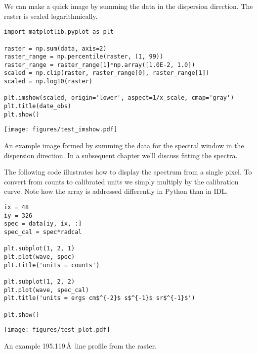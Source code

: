 We can make a quick image by summing the data in the dispersion direction. The
raster is scaled logarithmically.
\begin{lstlisting}
import matplotlib.pyplot as plt

raster = np.sum(data, axis=2)
raster_range = np.percentile(raster, (1, 99))
raster_range = raster_range[1]*np.array([1.0E-2, 1.0])
scaled = np.clip(raster, raster_range[0], raster_range[1])
scaled = np.log10(raster)

plt.imshow(scaled, origin='lower', aspect=1/x_scale, cmap='gray')
plt.title(date_obs)
plt.show()
\end{lstlisting}
\begin{marginfigure}
  \centerline{\texttt{[image: figures/test\_imshow.pdf]}}
  \caption{An example image formed by summing the data for the  spectral window in the
    dispersion direction. In a subsequent chapter we'll discuss fitting the spectra.}
  \label{fig:raster}
\end{marginfigure}

The following code illustrates how to display the spectrum from a single pixel. To convert from
counts to calibrated units we simply multiply by the calibration curve. Note how the array is
addressed differently in Python than in IDL.
\begin{lstlisting}
ix = 48
iy = 326
spec = data[iy, ix, :]
spec_cal = spec*radcal

plt.subplot(1, 2, 1)
plt.plot(wave, spec)
plt.title('units = counts')

plt.subplot(1, 2, 2)
plt.plot(wave, spec_cal)
plt.title('units = ergs cm$^{-2}$ s$^{-1}$ sr$^{-1}$')

plt.show()
\end{lstlisting}
\begin{marginfigure}
  \centerline{\texttt{[image: figures/test\_plot.pdf]}}
  \caption{An example  195.119\,\AA\ line profile from the raster.}
  \label{fig:spectrum}
\end{marginfigure}

